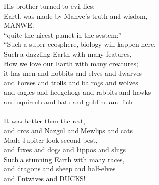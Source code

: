 \begin{multicols}{2}
His brother turned to evil lies;
\\
Earth was made by Manwe’s truth and wisdom,
\\
MANWE: 
\\
“quite the nicest planet in the system:”
\\
“Such a super ecosphere, biology will happen here,
\\
Such a dazzling Earth with many features,
\\
How we love our Earth with many creatures;
\\
it has men and hobbits and elves and dwarves
\\
and horses and trolls and balrogs and wolves
\\
and eagles and hedgehogs and rabbits and hawks
\\
and squirrels and bats and goblins and fish
\\
\\
It was better than the rest,
\\
and orcs and Nazgul and Mewlips and cats
\\
Made Jupiter look second-best,
\\
and foxes and dogs and hippos and slugs
\\
Such a stunning Earth with many races,
\\
and dragons and sheep and half-elves
\\
and Entwives and DUCKS!
\end{multicols}
